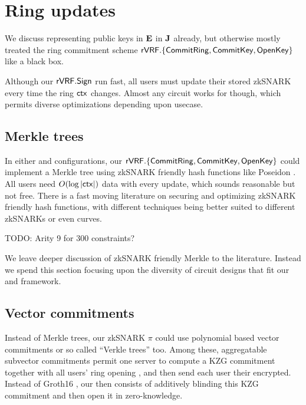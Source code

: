 \section{Ring updates}
\label{sec:ring_updates}

We discuss \pifast representing public keys in ${\mathbf{E}}$ in ${\mathbf{J}}$ already,
but otherwise mostly treated the ring commitment scheme
${\mathsf{rVRF}}.\{ {\mathsf{CommitRing}}, {\mathsf{CommitKey}}, {\mathsf{OpenKey}} \}$ like a black box.

Although our ${\mathsf{rVRF}}.{\mathsf{Sign}}$ run fast, all users must update their
stored zkSNARK \pifast every time the ring $\mathsf{ctx}$ changes.
Almost any circuit works for \pifast though,
 which permits diverse optimizations depending upon usecase.


\subsection{Merkle trees} %

In either \pifast and \pisafe configurations, 
our ${\mathsf{rVRF}}.\{ {\mathsf{CommitRing}}, {\mathsf{CommitKey}}, {\mathsf{OpenKey}} \}$ could implement a
Merkle tree using zkSNARK friendly hash functions like Poseidon \cite{poseidon}.
%
All users need $O(\log |\mathsf{ctx}|)$ data with every update, which sounds
reasonable but not free.  There is a fast moving literature on securing
and optimizing zkSNARK friendly hash functions, with different techniques
being better suited to different zkSNARKs or even curves.

TODO: Arity 9 for 300 constraints?   %

We leave deeper discussion of zkSNARK friendly Merkle to the literature.
Instead we spend this section focusing upon the diversity of circuit
designs that fit our \pifast and \pisafe framework.


\subsection{Vector commitments}

Instead of Merkle trees, our zkSNARK $\pi$ could use polynomial based
vector commitments \cite{KZG} or so called ``Verkle trees'' \cite{??Verkle??} too.
%
Among these, aggregatable subvector commitments \cite{aSVC} permit
one server to compute a KZG commitment \comring together with all users'
ring opening \openring,  and then send each user their \openring encrypted.
Instead of Groth16 \cite{groth16}, our \pisafe then consists
of additively blinding this KZG commitment and then open it in zero-knowledge.

